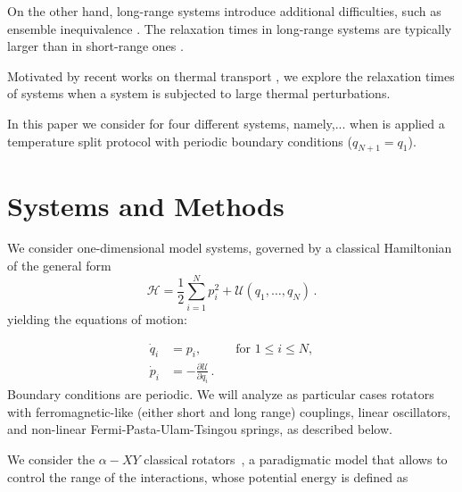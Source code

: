 \documentclass[aps,pre,showpacs,twocolumn,superscriptaddress,floatfix]{revtex4-1}
\newcommand{\Ham}{\mathcal{H}}
\begin{document}

On the other hand, long-range systems introduce additional difficulties, 
such as  ensemble inequivalence \cite{BarreMukamelRuffo2001PRL}. 
The relaxation times in long-range systems
are typically larger than in short-range ones
\cite{MukamelRuffoSchreiber2005,Miloshevich2015PRE,AntunesLevin2015PRE,
BagchiTsallis2017,Teles2015PRE}. 
%

Motivated by recent works on thermal transport 
\cite{Bagchi2017PRE,OlivaresAnteneodo2016PRE,Pereira2013PRE}, 
we explore the relaxation times of systems when
a system  is subjected to large thermal perturbations.

In this paper we consider for four different systems, namely,...  
when is applied a temperature
split protocol with periodic boundary conditions ($q_{N+1}= q_1$). 

 
\section{Systems and Methods} 
\label{sec:ModelMethods}


We consider one-dimensional model systems, 
governed by a classical Hamiltonian of the general form
%
\begin{equation}
 \Ham =\frac{1}{2} \sum_{i=1}^{N} p^2_i +  \mathcal{U}(q_1,\ldots,q_N)  \,.
\end{equation}
%
yielding the equations of motion:

\begin{equation}
\begin{split}
 \dot{q}_i & = p_i, \hspace{1cm} \text{ for } 1 \le i \le N, \\
 \dot{p}_i      & = -\frac{\partial \mathcal{U}}{\partial q_{i} } \,.
\end{split}
\label{eqmotion}
\end{equation}
Boundary conditions are periodic. 
We will  analyze as particular cases   rotators 
 with ferromagnetic-like (either short and long range) couplings, linear oscillators, and  
 non-linear Fermi-Pasta-Ulam-Tsingou springs, as described below. 
%
 
 

We consider the $\alpha-XY$ classical rotators~\cite{Anteneodo1998,TamaritAnteneodo2000}, 
a paradigmatic model that allows to control the range of the interactions,  whose 
potential energy is defined as  
\end{document}
